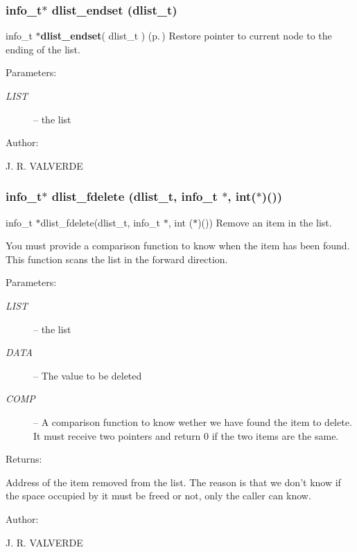 \subsubsection{\setlength{\rightskip}{0pt plus 5cm}info\_\-t$\ast$ dlist\_\-endset ({\bf dlist\_\-t})}\label{P__dlist_8h_a16}


info\_\-t $\ast${\bf dlist\_\-endset}( dlist\_\-t ) {\rm (p.\,\pageref{P__dlist_8h_a16})} Restore pointer to current node to the ending of the list.

\begin{Desc}
\item[Parameters: ]\par
\begin{description}
\item[{\em 
LIST}]-- the list\end{description}
\end{Desc}
\begin{Desc}
\item[Author: ]\par
J. R. VALVERDE \end{Desc}
\subsubsection{\setlength{\rightskip}{0pt plus 5cm}info\_\-t$\ast$ dlist\_\-fdelete ({\bf dlist\_\-t}, info\_\-t $\ast$, int($\ast$)())}\label{P__dlist_8h_a21}


info\_\-t $\ast$dlist\_\-fdelete(dlist\_\-t, info\_\-t $\ast$, int ($\ast$)()) Remove an item in the list.

You must provide a comparison function to know when the item has been found. This function scans the list in the forward direction.\begin{Desc}
\item[Parameters: ]\par
\begin{description}
\item[{\em 
LIST}]-- the list \item[{\em 
DATA}]-- The value to be deleted \item[{\em 
COMP}]-- A comparison function to know wether we have found the item to delete. It must receive two pointers and return 0 if the two items are the same.\end{description}
\end{Desc}
\begin{Desc}
\item[Returns: ]\par
Address of the item removed from the list. The reason is that we don't know if the space occupied by it must be freed or not, only the caller can know.\end{Desc}
\begin{Desc}
\item[Author: ]\par
J. R. VALVERDE \end{Desc}
